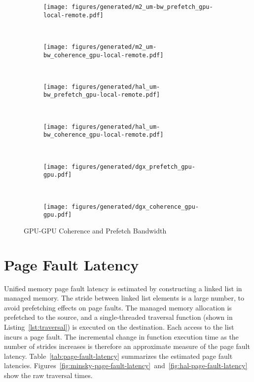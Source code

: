 \begin{figure}[ht]
    \centering
    \begin{subfigure}[b]{0.45\textwidth}
        \texttt{[image: figures/generated/m2\_um-bw\_prefetch\_gpu-local-remote.pdf]}
        \caption{}
        \label{fig:um-prefetch-s822lc-gpu-gpu}
    \end{subfigure}
    ~
    \begin{subfigure}[b]{0.45\textwidth}
        \texttt{[image: figures/generated/m2\_um-bw\_coherence\_gpu-local-remote.pdf]}
        \caption{}
        \label{fig:um-coherence-s822lc-gpu-gpu}
    \end{subfigure}
    \\
    \begin{subfigure}[b]{0.45\textwidth}
        \texttt{[image: figures/generated/hal\_um-bw\_prefetch\_gpu-local-remote.pdf]}
        \caption{}
        \label{fig:um-prefetch-ac922-gpu-gpu}
    \end{subfigure}
    ~
    \begin{subfigure}[b]{0.45\textwidth}
        \texttt{[image: figures/generated/hal\_um-bw\_coherence\_gpu-local-remote.pdf]}
        \caption{}
        \label{fig:um-coherence-ac922-gpu-gpu}
    \end{subfigure}
    \\
    \begin{subfigure}[b]{0.45\textwidth}
        \texttt{[image: figures/generated/dgx\_prefetch\_gpu-gpu.pdf]}
        \caption{}
        \label{}
    \end{subfigure}
    ~
    \begin{subfigure}[b]{0.45\textwidth}
        \texttt{[image: figures/generated/dgx\_coherence\_gpu-gpu.pdf]}
        \caption{}
        \label{}
    \end{subfigure}
    \caption[]{
        GPU-GPU Coherence and Prefetch Bandwidth
    }
    \label{fig:um-coherence-gpu-gpu}
\end{figure}




\section{Page Fault Latency}

Unified memory page fault latency is estimated by constructing a linked list in managed memory.
The stride between linked list elements is a large number, to avoid prefetching effects on page faults.
The managed memory allocation is prefetched to the source, and a single-threaded traversal function (shown in Listing~\ref{lst:traversal}) is executed on the destination.
Each access to the list incurs a page fault.
The incremental change in function execution time as the number of strides increases is therefore an approximate measure of the page fault latency.
Table~\ref{tab:page-fault-latency} summarizes the estimated page fault latencies.
Figures~\ref{fig:minsky-page-fault-latency}~and~\ref{fig:hal-page-fault-latency} show the raw traversal times.

